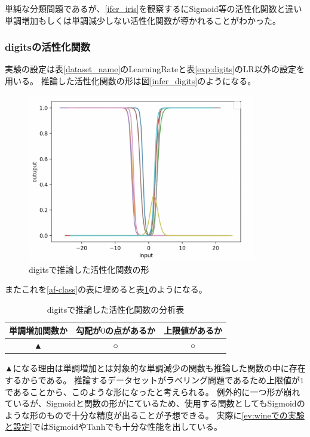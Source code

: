 単純な分類問題であるが、\ref{ifer_iris}を観察するにSigmoid等の活性化関数と違い単調増加もしくは単調減少しない活性化関数が導かれることがわかった。




\subsubsection{digitsの活性化関数}
実験の設定は表\ref{dataset_name}のLearningRateと表\ref{exp:digits}のLR以外の設定を用いる。
推論した活性化関数の形は図\ref{infer_digits}のようになる。
\begin{figure}[hbtp]
    \begin{center}
        \includegraphics[width=10cm]{asset/digits-0.1.png}
            \caption{digitsで推論した活性化関数の形}
            \label{ifer_digits}
    \end{center}
\end{figure}

またこれを\ref{af-class}の表に埋めると表\ref{anal_digits}のようになる。
\begin{table}[htbp]
    \begin{center}
        \caption{digitsで推論した活性化関数の分析表}
        \label{anal_digits}
        \vspace{2mm} 
        \begin{tabular}{ |c|c|c| }
        単調増加関数か & 勾配が$ 0 $の点があるか & 上限値があるか   \\
        \hline
        ▲ & ○ & ○   \\
        \end{tabular}
    \end{center}
\end{table}

▲になる理由は単調増加とは対象的な単調減少の関数も推論した関数の中に存在するからである。
推論するデータセットがラベリング問題であるため上限値が$ 1 $であることから、このような形になったと考えられる。
例外的に一つ形が崩れているが、Sigmoidと関数の形がにているため、使用する関数としてもSigmoidのような形のもので十分な精度が出ることが予想できる。
実際に\ref{ev:wineでの実験と設定}ではSigmoidやTanhでも十分な性能を出している。


